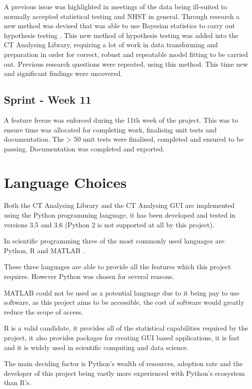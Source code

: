 \documentclass[11pt]{report}
\begin{document}
A previous issue was highlighted in meetings of the data being ill-suited to normally accepted statistical testing and NHST in general. Through research a new method was devised that was able to use Bayesian statistics to carry out hypothesis testing \cite{Kruschke2012}. This new method of hypothesis testing was added into the CT Analysing Library, requiring a lot of work in data transforming and preparation in order for correct, robust and repeatable model fitting to be carried out.
Previous research questions were repeated, using this method. This time new and significant findings were uncovered.

\subsection{Sprint - Week 11}
\label{sec:org82fe343}
A feature freeze was enforced during the 11th week of the project. This was to ensure time was allocated for completing work, finalising unit tests and documentation. The > 50 unit tests were finalised, completed and ensured to be passing. Documentation was completed and exported.

\section{Language Choices}
\label{sec:orgd090908}
Both the CT Analysing Library and the CT Analysing GUI are implemented using the Python programming language, it has been developed and tested in versions 3.5 and 3.6 (Python 2 is not supported at all by this project).

In scientific programming three of the most commonly used languages are Python, R and MATLAB \cite{Ozgur2016}.

These three languages are able to provide all the features which this project requires. However Python was chosen for several reasons.

MATLAB could not be used as a potential language due to it being pay to use software, as this project aims to be accessible, the cost of software would greatly reduce the scope of access.

R is a valid candidate, it provides all of the statistical capabilities required by the project, it also provides packages for creating GUI based applications, it is fast and it is widely used in scientific computing and data science.

The main deciding factor is Python's wealth of resources, adoption rate and the developer of this project being vastly more experienced with Python's ecosystem than R's.
\end{document}
